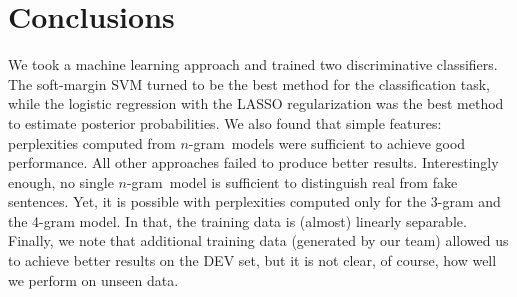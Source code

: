 \documentclass[11pt]{article}
\newcommand{\ngram}{\mbox{$n$-gram }}
\begin{document}
\section{Conclusions}
We took a machine learning approach and trained two discriminative classifiers.
The soft-margin SVM turned to be the best method for the classification task,
while the logistic regression with the LASSO regularization was
the best method to estimate posterior probabilities.
We also found that simple features: perplexities computed from \ngram models were sufficient to achieve good performance.
All other approaches failed to produce better results.
Interestingly enough, no single \ngram model is sufficient to distinguish real from fake sentences.
Yet, it is possible with perplexities computed only for the 3-gram and the 4-gram model. In that,
the training data is (almost) linearly separable.
Finally, we note that additional training data (generated by our team) allowed us to achieve better
results on the DEV set, but it is not clear, of course, how well we perform on unseen data.



\end{document}
